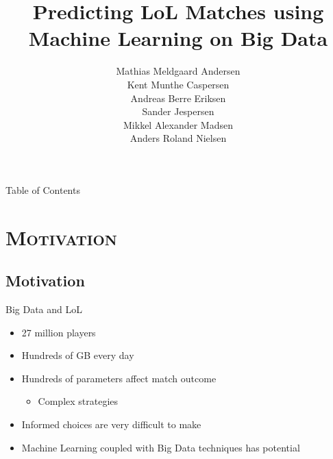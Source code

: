 
\begin{frame}
\title{\huge Predicting LoL Matches using Machine Learning on Big Data}

\author{
	Mathias Meldgaard Andersen\\
	Kent Munthe Caspersen\\
	Andreas Berre Eriksen\\
	Sander Jespersen\\
	Mikkel Alexander Madsen\\
	Anders Roland Nielsen\\
}

\titlepage
\end{frame}

\begin{frame}{Table of Contents}
\tableofcontents
\end{frame}

\section{\scshape Motivation}
\subsection{Motivation}

\begin{frame}{Big Data and LoL}
	\begin{itemize}
	\item 27 million players	
	\item Hundreds of GB every day
	\item Hundreds of parameters affect match outcome
		\begin{itemize}
			\item Complex strategies
		\end{itemize}
	\item Informed choices are very difficult to make
	\item Machine Learning coupled with Big Data techniques has potential
	\end{itemize}
	
\end{frame}

